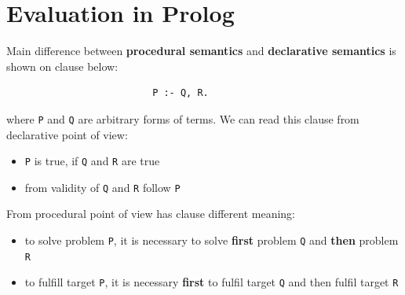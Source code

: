 \documentclass[11pt,twoside,a4paper]{book}
\begin{document}
\section{Evaluation in Prolog}
Main difference between \textbf{procedural semantics} and \textbf{declarative
semantics} is shown on clause below:
\begin{verbatim}
                          P :- Q, R.
\end{verbatim}
where \verb|P| and \verb|Q| are arbitrary forms of terms. We can read this
clause from declarative point of view:
\begin{itemize}
  \item \verb|P| is true, if \verb|Q| and \verb|R| are true
  \item from validity of \verb|Q| and \verb|R| follow \verb|P|
\end{itemize}
From procedural point of view has clause different meaning:
\begin{itemize}
  \item to solve problem \verb|P|, it is necessary to solve \textbf{first}
  problem \verb|Q| and \textbf{then} problem \verb|R|
  \item to fulfill target \verb|P|, it is necessary \textbf{first} to fulfil
  target \verb|Q| and then fulfil target \verb|R|
\end{itemize}
\end{document}
